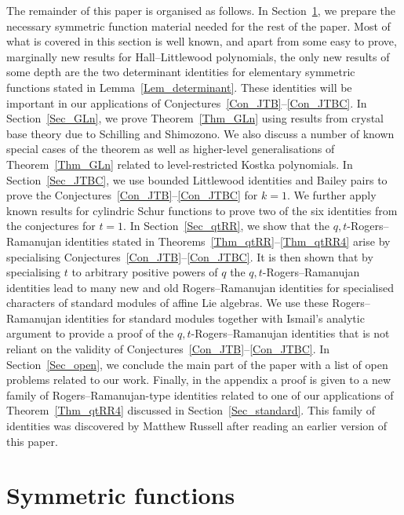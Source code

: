 \documentclass[pdftex]{sigma}
\numberwithin{equation}{section}
\begin{document}
The remainder of this paper is organised as follows.
In Section~\ref{Sec_SF}, we prepare the necessary symmetric function
material needed for the rest of the paper.
Most of what is covered in this section is well known, and apart from some
easy to prove, marginally new results for Hall--Littlewood polynomials,
the only new results of some depth are the two determinant
identities for elementary symmetric functions stated in
Lemma~\ref{Lem_determinant}.
These identities will be important in our applications of
Conjectures~\ref{Con_JTB}--\ref{Con_JTBC}.
In Section~\ref{Sec_GLn}, we prove Theorem~\ref{Thm_GLn} using results
from crystal base theory due to Schilling and Shimozono.
We also discuss a number of known special cases of the theorem
as well as higher-level generalisations of Theorem~\ref{Thm_GLn}
related to level-restricted Kostka polynomials.
In Section~\ref{Sec_JTBC}, we use bounded Littlewood identities
and Bailey pairs to prove the Conjectures~\ref{Con_JTB}--\ref{Con_JTBC}
for $k=1$.
We further apply known results for cylindric Schur functions to prove
two of the six identities from the conjectures for $t=1$.
In Section~\ref{Sec_qtRR}, we show that the
$q,t$-Rogers--Ramanujan identities stated in
Theorems~\ref{Thm_qtRR}--\ref{Thm_qtRR4} arise by specialising
Conjectures~\ref{Con_JTB}--\ref{Con_JTBC}.
It is then shown that by specialising $t$ to arbitrary
positive powers of $q$ the $q,t$-Rogers--Ramanujan
identities lead to many new and old Rogers--Ramanujan identities
for specialised characters of standard modules of affine Lie algebras.
We use these Rogers--Ramanujan identities for standard modules together with
Ismail's analytic argument to provide a proof of the
$q,t$-Rogers--Ramanujan identities that is not reliant on the
validity of Conjectures~\ref{Con_JTB}--\ref{Con_JTBC}.
In Section~\ref{Sec_open}, we conclude the main part of the paper
with a list of open problems related to our work.
Finally, in the appendix a proof is given to a new family of
Rogers--Ramanujan-type identities related to one of our applications
of Theorem~\ref{Thm_qtRR4} discussed in Section~\ref{Sec_standard}.
This family of identities was discovered by Matthew Russell after reading
an earlier version of this paper.

\section{Symmetric functions}\label{Sec_SF}

\end{document}
